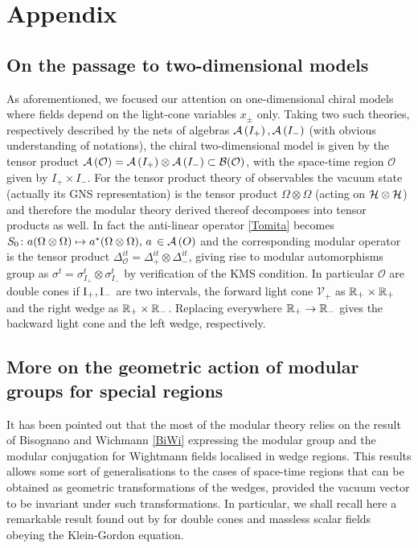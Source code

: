 \chapter{Appendix}
\label{ch:Appendix}
\minitoc\mtcskip

\section{On the passage to two-dimensional models}
As aforementioned, we focused our attention on 
one-dimensional chiral models where fields depend
on the light-cone variables $x_{\pm}$ only. 
Taking two such theories, respectively described by the nets
of algebras $\mathcal{A}\left(I_+\right), \mathcal{A}\left(I_-\right)$ (with obvious
understanding of notations), the chiral two-dimensional
model is given by the tensor product $\mathcal{A}\left(\mathcal{O}\right)=\mathcal{A}\left(I_+\right)\otimes
\mathcal{A}\left(I_-\right)\subset\mathcal{B}(\mathcal{O})$, with the space-time region 
$\mathcal{O}$ given by $I_+\times I_-$. For the tensor product
theory of observables the vacuum state (actually its
\ac{GNS} representation) is the tensor product 
$\Omega\otimes\Omega$ (acting on $\mathcal{H}\otimes\mathcal{H}$)
and therefore the modular theory
derived thereof decomposes into tensor products as 
well. In fact the anti-linear operator \eqref{Tomita}
becomes $S_0\colon a(\Omega\otimes\Omega)\mapsto 
a^*(\Omega\otimes\Omega),\,a\,\in\mathcal{A}\left(O\right)$ and the 
corresponding modular operator is the tensor product
$\Delta_{\mathcal{O}}^{it}=\Delta_+^{it}\otimes
\Delta_-^{it}$, giving rise to modular automorphisms group 
as $\sigma^t=\sigma^t_{I_+}\otimes\sigma^t_{I_-}$
by verification of the \ac{KMS} condition.
In particular $\mathcal{O}$ are double cones
if $\textrm{I}_+,\textrm{I}_-$ are two intervals, the forward light 
cone $\mathcal{V}_+$ as $\mathbb{R}_+\times\mathbb{R}_+$ and the
right wedge as $\mathbb{R}_+\times\mathbb{R}_-$. Replacing everywhere
$\mathbb{R}_+\to\mathbb{R}_-$ gives the backward light cone and the 
left wedge, respectively.


\section{More on the geometric action of modular groups
for special regions}
It has been pointed out that the most of the modular theory
relies on the result of Bisognano and Wichmann 
\eqref{BiWi} expressing the modular group and the 
modular conjugation for Wightmann fields localised in 
wedge regions. This results allows some sort of
generalisations to the cases of space-time regions
that can be obtained as geometric transformations of
the wedges, provided the vacuum vector to be invariant
under such transformations. In particular, we shall recall
here a remarkable result found out by \cite{HisLon:1982}
for double cones and massless scalar fields obeying the 
Klein-Gordon equation. 

